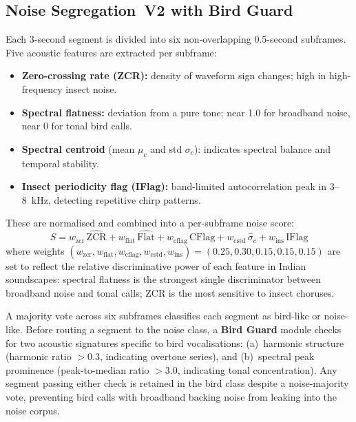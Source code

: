 \documentclass[conference]{IEEEtran}
\begin{document}
\subsection{Noise Segregation~V2 with Bird Guard}
Each 3-second segment is divided into six non-overlapping 0.5-second subframes. Five acoustic features are extracted per subframe:

\begin{itemize}[leftmargin=*]
    \item \textbf{Zero-crossing rate (ZCR):} density of waveform sign changes; high in high-frequency insect noise.
    \item \textbf{Spectral flatness:} deviation from a pure tone; near 1.0 for broadband noise, near 0 for tonal bird calls.
    \item \textbf{Spectral centroid} (mean $\mu_c$ and std $\sigma_c$): indicates spectral balance and temporal stability.
    \item \textbf{Insect periodicity flag (IFlag):} band-limited autocorrelation peak in 3--8~kHz, detecting repetitive chirp patterns.
\end{itemize}

These are normalised and combined into a per-subframe noise score:
\begin{equation}
S = w_\text{zcr}\,\hat{\mathrm{ZCR}}
  + w_\text{flat}\,\hat{\mathrm{Flat}}
  + w_\text{cflag}\,\mathrm{CFlag}
  + w_\text{cstd}\,\hat{\sigma}_c
  + w_\text{ins}\,\mathrm{IFlag}
\label{eq:noisescore}
\end{equation}
where weights $(w_\text{zcr},w_\text{flat},w_\text{cflag},w_\text{cstd},w_\text{ins}) = (0.25,0.30,0.15,0.15,0.15)$ are set to reflect the relative discriminative power of each feature in Indian soundscapes: spectral flatness is the strongest single discriminator between broadband noise and tonal calls; ZCR is the most sensitive to insect choruses.

A majority vote across six subframes classifies each segment as bird-like or noise-like. Before routing a segment to the noise class, a \textbf{Bird Guard} module checks for two acoustic signatures specific to bird vocalisations: (a)~harmonic structure (harmonic ratio $> 0.3$, indicating overtone series), and (b)~spectral peak prominence (peak-to-median ratio $> 3.0$, indicating tonal concentration). Any segment passing either check is retained in the bird class despite a noise-majority vote, preventing bird calls with broadband backing noise from leaking into the noise corpus.
\end{document}
